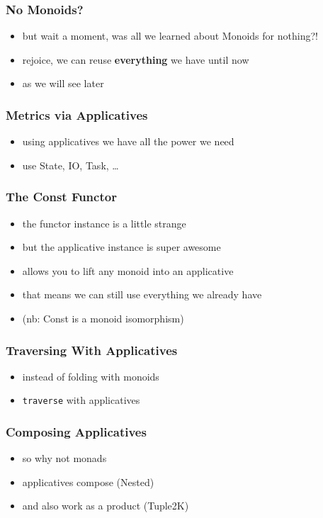 \documentclass[aspectratio=169]{beamer}
\begin{document}
\begin{frame}
  \frametitle{No Monoids?}
  \begin{itemize}
  \item but wait a moment, was all we learned about Monoids for nothing?!
  \item rejoice, we can reuse \textbf{everything} we have until now
  \item as we will see later
  \end{itemize}
\end{frame}

\begin{frame}
  \frametitle{Metrics via Applicatives}
  \begin{itemize}
  \item using applicatives we have all the power we need
  \item use State, IO, Task, \ldots
  \end{itemize}
\end{frame}

\begin{frame}
  \frametitle{The Const Functor}
  \begin{itemize}
  \item the functor instance is a little strange
  \item but the applicative instance is super awesome
  \item allows you to lift any monoid into an applicative
  \item that means we can still use everything we already have
  \item (nb: Const is a monoid isomorphism)
  \end{itemize}
\end{frame}

\begin{frame}
  \frametitle{Traversing With Applicatives}
  \begin{itemize}
  \item instead of folding with monoids
  \item \texttt{traverse} with applicatives
  \end{itemize}
\end{frame}

\begin{frame}
  \frametitle{Composing Applicatives}
  \begin{itemize}
  \item so why not monads
  \item applicatives compose (Nested)
  \item and also work as a product (Tuple2K)
  \end{itemize}
\end{frame}
\end{document}

